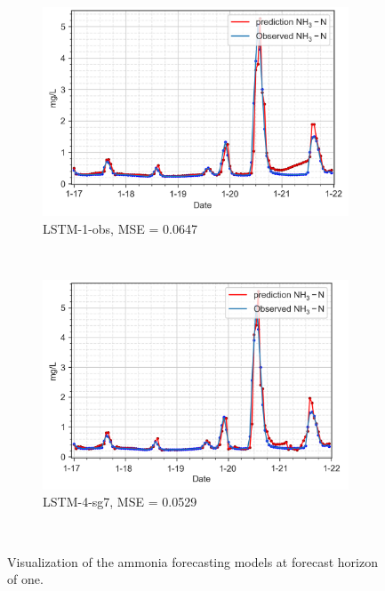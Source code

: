 \begin{figure}[!ht]
  \centering
  \begin{subfigure}[t]{0.75\textwidth}
    \includegraphics[width=\linewidth]{imgs/results/steps/nh3-lstm-1-fc1.png}
    \caption{LSTM-1-obs, MSE = 0.0647} \label{fig:nh3-lstm-1-fc1}
  \end{subfigure}\\
  \vspace{2em}
  \begin{subfigure}[t]{0.75\textwidth}
    \includegraphics[width=\linewidth]{imgs/results/steps/nh3-lstm-4-fc1.png}
    \caption{LSTM-4-sg7, MSE = 0.0529} \label{fig:nh3-lstm-4-fc1}
  \end{subfigure}\\
\caption{Visualization of the ammonia forecasting models at forecast horizon of one.} \label{fig:nh3-forecast-fc1}
\end{figure}

